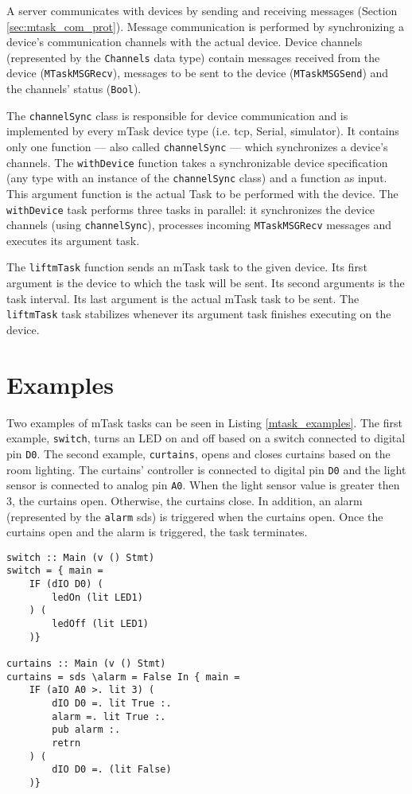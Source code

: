 A server communicates with devices by sending and receiving messages (Section \ref{sec:mtask_com_prot}). Message communication is performed by synchronizing a device's communication channels with the actual device. Device channels (represented by the \texttt{Channels} data type) contain messages received from the device (\texttt{MTaskMSGRecv}), messages to be sent to the device (\texttt{MTaskMSGSend}) and the channels' status (\texttt{Bool}). 

The \texttt{channelSync} class is responsible for device communication and is implemented by every \gls{mTask} device type (i.e. \acs{tcp}, Serial, simulator). It contains only one function --- also called \texttt{channelSync} --- 
which synchronizes a device's channels. The \texttt{withDevice} function takes a synchronizable device specification (any type with an instance of the \texttt{channelSync} class) and a function as input. This argument function is the actual Task to be performed with the device. The \texttt{withDevice} task performs three tasks in parallel: it synchronizes the device channels (using \texttt{channelSync}), processes incoming \texttt{MTaskMSGRecv} messages and executes its argument task. 

The \texttt{liftmTask} function sends an \gls{mTask} task to the given device. Its first argument is the device to which the task will be sent. Its second arguments is the task interval. Its last argument is the actual \gls{mTask} task to be sent. The \texttt{liftmTask} task stabilizes whenever its argument task finishes executing on the device. 

\section{Examples}

Two examples of \gls{mTask} tasks can be seen in Listing \ref{mtask_examples}. The first example, \texttt{switch}, turns an LED on and off based on a switch connected to digital pin \texttt{D0}. The second example, \texttt{curtains}, opens and closes curtains based on the room lighting. The curtains' controller is connected to digital pin \texttt{D0} and the light sensor is connected to analog pin \texttt{A0}. When the light sensor value is greater then 3, the curtains open. Otherwise, the curtains close. In addition, an alarm (represented by the \texttt{alarm} \ac{sds}) is triggered when the curtains open. Once the curtains open and the alarm is triggered, the task terminates.

\begin{lstlisting}[caption=Examples of mTask tasks,captionpos=b,label=mtask_examples]
switch :: Main (v () Stmt) 
switch = { main = 
	IF (dIO D0) (
		ledOn (lit LED1)
	) (
		ledOff (lit LED1)
	)}
	
curtains :: Main (v () Stmt)
curtains = sds \alarm = False In { main = 
	IF (aIO A0 >. lit 3) (
		dIO D0 =. lit True :.
		alarm =. lit True :.
		pub alarm :.
		retrn
	) (
		dIO D0 =. (lit False)
	)}
\end{lstlisting}





